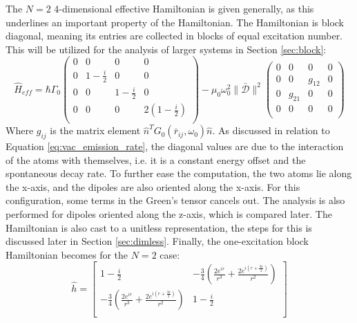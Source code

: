 \documentclass{article}
\begin{document}
The $N=2$ 4-dimensional effective Hamiltonian is given generally, as this underlines an important property of the Hamiltonian. The Hamiltonian is block diagonal, meaning its entries are collected in blocks of equal excitation number. This will be utilized for the analysis of larger systems in Section \ref{sec:block}:
\begin{equation}\label{eq:N2_general}
    \hat{H}_{eff} = \hbar \Gamma_0
    \begin{pmatrix}
        0 & 0 & 0 & 0 \\
        0 & 1 - \frac{i}{2} & 0 & 0 \\
        0 & 0 & 1 - \frac{i}{2} & 0 \\
        0 & 0 & 0 & 2 \left( 1 - \frac{i}{2} \right) \\
    \end{pmatrix}
    - \mu_0 \omega_0^2 \| \bar{\mathscr{D}} \|^2
    \begin{pmatrix}
        0 & 0 & 0 & 0 \\
        0 & 0 & g_{12} & 0 \\
        0 & g_{21} & 0 & 0 \\
        0 & 0 & 0 & 0 \\
    \end{pmatrix}
\end{equation}
Where $g_{ij}$ is the matrix element $\hat{n}^T G_0(\bar{r}_{ij},\omega_0) \hat{n}$. As discussed in relation to Equation \ref{eq:vac_emission_rate}, the diagonal values are due to the interaction of the atoms with themselves, i.e. it is a constant energy offset and the spontaneous decay rate. To further ease the computation, the two atoms lie along the x-axis, and the dipoles are also oriented along the x-axis. For this configuration, some terms in the Green's tensor cancels out. The analysis is also performed for dipoles oriented along the z-axis, which is compared later. The Hamiltonian is also cast to a unitless representation, the steps for this is discussed later in Section \ref{sec:dimless}. Finally, the one-excitation block Hamiltonian becomes for the $N=2$ case:
\begin{equation}\label{eq:N2_Ham_block}
    \hat{h} = 
    \begin{bmatrix} 
        1 - \frac{i}{2} & -\frac{3}{4}\left( \frac{2e^{ir}}{r^3} + \frac{2e^{i(r+\frac{3\pi}{2})}}{r^2} \right) \\ 
        -\frac{3}{4}\left( \frac{2e^{ir}}{r^3} + \frac{2e^{i(r+\frac{3\pi}{2})}}{r^2} \right) & 1 - \frac{i}{2} \\
    \end{bmatrix}
\end{equation}
\end{document}
